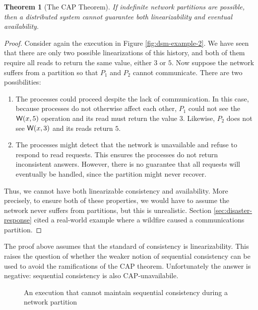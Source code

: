 \documentclass[]             %
{NASA}                       %
\newtheorem{theorem}{Theorem}[section]
\theoremstyle{definition}
\begin{document}
\begin{theorem}[The CAP Theorem]
  \label{thm:cap}
  If indefinite network partitions are possible, then a distributed
  system cannot guarantee both linearizability and
  eventual availability.
\end{theorem}
\begin{proof}
  Consider again the execution in Figure \ref{fig:dsm-example-2}. We have seen
  that there are only two possible linearizations of this history, and
  both of them require all reads to return the same value, either $3$
  or $5$. Now suppose the network suffers from a partition so that
  $P_1$ and $P_2$ cannot communicate. There are two possibilities:
  \begin{enumerate}
  \item The processes could proceed despite the lack of
    communication. In this case, because processes do not otherwise
    affect each other, $P_1$ could not see the $\mathsf{W}\!\left(x, 5\right)$
    operation and its read must return the value $3$. Likewise, $P_2$
    does not see $\mathsf{W}\!\left(x, 3\right)$ and its reads return $5$.
  \item The processes might detect that the network is unavailable and
    refuse to respond to read requests. This ensures the processes do
    not return inconsistent answers. However, there is no guarantee
    that all requests will eventually be handled, since the partition
    might never recover.
  \end{enumerate}

  Thus, we cannot have both linearizable consistency and
  availability. More precisely, to ensure both of these properties, we
  would have to assume the network never suffers from partitions, but
  this is unrealistic. Section \ref{sec:disaster-response} cited a
  real-world example where a wildfire caused a communications
  partition.
\end{proof}


The proof above assumes that the standard of consistency is
linearizability. This raises the question of whether the weaker notion
of sequential consistency can be used to avoid the ramifications of
the CAP theorem. Unfortunately the answer is negative: sequential
consistency is also CAP-unavailabile.

\begin{figure}
  
  \caption{An execution that cannot maintain sequential consistency during a network partition}
  \label{fig:dsm-cap-example-2}
\end{figure}
\end{document}
